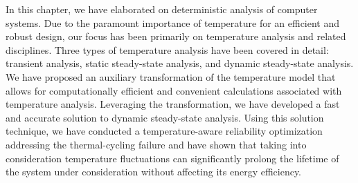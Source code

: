 In this chapter, we have elaborated on deterministic analysis of computer
systems. Due to the paramount importance of temperature for an efficient and
robust design, our focus has been primarily on temperature analysis and related
disciplines. Three types of temperature analysis have been covered in detail:
transient analysis, static steady-state analysis, and dynamic steady-state
analysis. We have proposed an auxiliary transformation of the temperature model
that allows for computationally efficient and convenient calculations associated
with temperature analysis. Leveraging the transformation, we have developed a
fast and accurate solution to dynamic steady-state analysis. Using this solution
technique, we have conducted a temperature-aware reliability optimization
addressing the thermal-cycling failure and have shown that taking into
consideration temperature fluctuations can significantly prolong the lifetime of
the system under consideration without affecting its energy efficiency.
